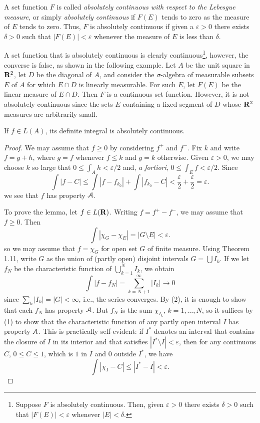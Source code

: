 A set function $F$ is called \emph{absolutely continuous with respect to
  the Lebesgue measure}, or simply \emph{absolutely continuous} if $F(E)$
tends to zero as the measure of $E$ tends to zero. Thus, $F$ is absolutely
continuous if given a $\varepsilon>0$ there exists $\delta>0$ such that
$|F(E)|<\varepsilon$ whenever the measure of $E$ is less than $\delta$.

A set function that is absolutely continuous is clearly
continuous\footnote{Suppose $F$ is absolutely continuous. Then, given
  $\varepsilon>0$ there exists $\delta>0$ such that $|F(E)|<\varepsilon$
  whenever $|E|<\delta$.}, however, the converse is false, as shown in the
following example. Let $A$ be the unit square in $\mathbf{R}^2$, let $D$ be the
diagonal of $A$, and consider the $\sigma$-algebra of measurable subsets
$E$ of $A$ for which $E\cap D$ is linearly measurable. For such $E$, let
$F(E)$ be the linear measure of $E\cap D$. Then $F$ is a continuous set
function. However, it is not absolutely continuous since the sets $E$
containing a fixed segment of $D$ whose $\mathbf{R}^2$-measures are arbitrarily
small.

\begin{theorem}[7.1]
If $f\in L(A)$, its definite integral is absolutely continuous.
\end{theorem}
\begin{proof}
We may assume that $f\geq 0$ by considering $f^+$ and $f^-$. Fix $k$ and
write $f=g+h$, where $g=f$ whenever $f\leq k$ and $g=k$ otherwise. Given
$\varepsilon>0$, we may choose $k$ so large that $0\leq\int_A
h<\varepsilon/2$ and, \emph{a fortiori}, $0\leq\int_E f<\varepsilon/2$.
Since
\[
\int|f-C|\leq\int|f-f_{k_0}|+\int|f_{k_0}-C|<\frac{\varepsilon}{2}+\frac{\varepsilon}{2}=\varepsilon.
\]
we see that $f$ has property $\mathcal{A}$.

To prove the lemma, let $f\in L(\mathbf{R})$. Writing $f=f^+-f^-$, we may assume
that $f\geq 0$. Then
\[
\int|\chi_G-\chi_E|=|G\setminus E|<\varepsilon.
\]
so we may assume that $f=\chi_G$ for open set $G$ of finite measure. Using
Theorem 1.11, write $G$ as the union of (partly open) disjoint intervals
$G=\bigcup I_k$. If we let $f_N$ be the characteristic function of
$\bigcup_{k=1}^N I_k$, we obtain
\[
\int|f-f_N|=\sum_{k=N+1}^\infty|I_k|\to 0
\]
since $\sum_k|I_k|=|G|<\infty$, i.e., the series converges. By (2), it is
enough to show that each $f_N$ has property $\mathcal{A}$. But $f_N$ is the sum
$\chi_{I_k}$, $k=1,\dotsc,N$, so it suffices by (1) to show that the
characteristic function of any partly open interval $I$ has property
$\mathcal{A}$. This is practically self-evident: if $I^*$ denotes an interval
that contains the closure of $I$ in its interior and that satisfies
$|I^*\setminus I|<\varepsilon$, then for any continuous $C$, $0\leq
C\leq 1$, which is $1$ in $I$ and $0$ outside $I^*$, we have
\[
\int|\chi_I-C|\leq|I^*-I|<\varepsilon.
\]
\end{proof}

